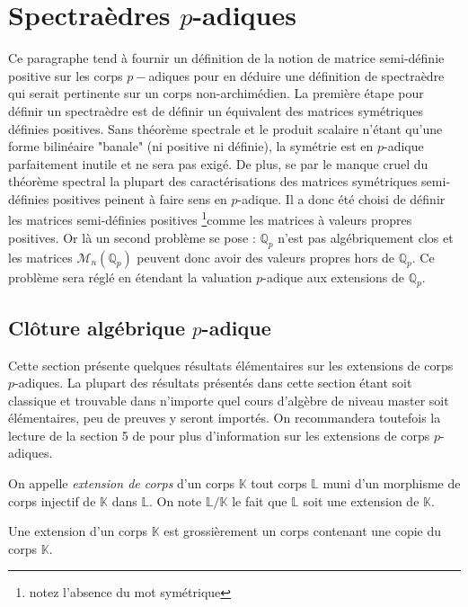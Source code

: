 \newcommand\mat{matrice semi-définie positive } 
\newcommand\Mat{Matrice semi-définie positive }
\newcommand\mats{matrices semi-définies positives }
\newcommand\Mats{Matrices semi-définies positives }


\section{Spectraèdres \texorpdfstring{$p$}{p}-adiques } 
Ce paragraphe tend à fournir un définition de la notion de \mat sur les corps $p-$adiques pour en déduire une définition de spectraèdre qui serait pertinente sur un corps non-archimédien. 
La première étape pour définir un spectraèdre est de définir un équivalent des matrices symétriques définies positives. Sans théorème spectrale et le produit scalaire n'étant qu'une forme bilinéaire "banale" (ni positive ni définie), la symétrie est en $p$-adique parfaitement inutile et ne sera pas exigé. De plus, se par le manque cruel du théorème spectral la plupart des caractérisations des matrices symétriques semi-définies positives peinent à faire sens en $p$-adique. 
Il a donc été choisi de définir les \mats \footnote{notez l'absence du mot symétrique}comme les matrices à valeurs propres positives.
Or là un second problème se pose : $\mathbb{Q}_{p} $ n'est pas algébriquement clos et les matrices $\mathcal{M}_n\left( \mathbb{Q}_{p}  \right) $ peuvent donc avoir des valeurs propres hors de $\mathbb{Q}_{p}$. Ce problème sera réglé en étendant la valuation $p$-adique aux extensions de $\mathbb{Q}_{p} $.

\subsection{Clôture algébrique \texorpdfstring{$p$}{p}-adique } 
Cette section présente quelques résultats élémentaires sur les extensions de corps $p$-adiques. La plupart des résultats présentés dans cette section étant soit classique et trouvable dans n'importe quel cours d'algèbre de niveau master soit élémentaires, peu de preuves y seront importés. On recommandera toutefois la lecture de la section 5 de \parencite{gouvea_p-adic_2003} pour plus d'information sur les extensions de corps $p$-adiques. 

\begin{definition}
	On appelle \textit{extension de corps} d'un corps $\mathbb{K}$ tout corps $\mathbb{L}$ muni d'un morphisme de corps injectif de $\mathbb{K}$ dans $\mathbb{L}$. On note $\mathbb{L}/\mathbb{K}$ le fait que $\mathbb{L}$ soit une extension de $\mathbb{K}.$
\end{definition}
Une extension d'un corps $\mathbb{K}$ est grossièrement un corps contenant une copie du corps $\mathbb{K}$.

